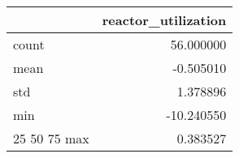 \begin{tabular}{lr}
\toprule
 & reactor\_utilization \\
\midrule
count & 56.000000 \\
mean & -0.505010 \\
std & 1.378896 \\
min & -10.240550 \\
25%
50%
75%
max & 0.383527 \\
\bottomrule
\end{tabular}

